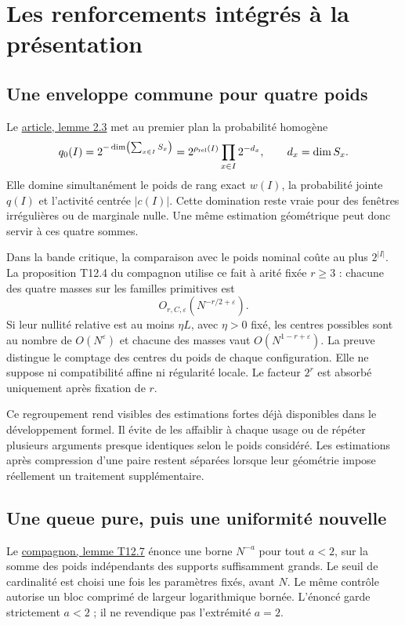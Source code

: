 \documentclass[11pt,a4paper]{article}
\newcommand{\article}[1]{\href{P1_V2_0_Main_EN.pdf}{article, #1}}
\newcommand{\compagnon}[1]{\href{P1_V2_0_Companion_EN.pdf}{compagnon, #1}}
\begin{document}
\section{Les renforcements intégrés à la présentation}

\subsection{Une enveloppe commune pour quatre poids}

Le \article{lemme 2.3} met au premier plan la probabilité homogène
\[
 q_0(I)=2^{-\dim\left(\sum_{x\in I}S_x\right)}
       =2^{\rho_{\rm rel}(I)}\prod_{x\in I}2^{-d_x},
 \qquad d_x=\dim S_x.
\]
Elle domine simultanément le poids de rang exact $w(I)$, la probabilité jointe $q(I)$ et l'activité centrée $|c(I)|$. Cette domination reste vraie pour des fenêtres irrégulières ou de marginale nulle. Une même estimation géométrique peut donc servir à ces quatre sommes.

Dans la bande critique, la comparaison avec le poids nominal coûte au plus $2^{|I|}$. La proposition T12.4 du compagnon utilise ce fait à arité fixée $r\ge3$ : chacune des quatre masses sur les familles primitives est
\[
 O_{r,C,\varepsilon}(N^{-r/2+\varepsilon}).
\]
Si leur nullité relative est au moins $\eta L$, avec $\eta>0$ fixé, les centres possibles sont au nombre de $O(N^\varepsilon)$ et chacune des masses vaut $O(N^{1-r+\varepsilon})$. La preuve distingue le comptage des centres du poids de chaque configuration. Elle ne suppose ni compatibilité affine ni régularité locale. Le facteur $2^r$ est absorbé uniquement après fixation de $r$.

Ce regroupement rend visibles des estimations fortes déjà disponibles dans le développement formel. Il évite de les affaiblir à chaque usage ou de répéter plusieurs arguments presque identiques selon le poids considéré. Les estimations après compression d'une paire restent séparées lorsque leur géométrie impose réellement un traitement supplémentaire.

\subsection{Une queue pure, puis une uniformité nouvelle}

Le \compagnon{lemme T12.7} énonce une borne $N^{-a}$ pour tout $a<2$, sur la somme des poids indépendants des supports suffisamment grands. Le seuil de cardinalité est choisi une fois les paramètres fixés, avant $N$. Le même contrôle autorise un bloc comprimé de largeur logarithmique bornée. L'énoncé garde strictement $a<2$ ; il ne revendique pas l'extrémité $a=2$.
\end{document}
